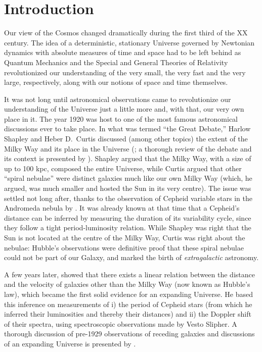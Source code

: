 
\chapter{Introduction}




Our view of the Cosmos changed dramatically during the first third of the XX century. The idea of a deterministic, stationary Universe governed by Newtonian dynamics with absolute measures of time and space had to be left behind as Quantum Mechanics and the Special and General Theories of Relativity revolutionized our understanding of the very small, the very fast and the very large, respectively, along with our notions of space and time themselves.

It was not long until astronomical observations came to revolutionize our understanding of the Universe just a little more and, with that, our very own place in it.
%
The year 1920 was host to one of the most famous astronomical discussions ever to take place. In what was termed ``the Great Debate,'' Harlow Shapley and Heber D.\ Curtis discussed (among other topics) the extent of the Milky Way and its place in the Universe (\citealt{shapley21}; a thorough review of the debate and its context is presented by \citealt{trimble95}). Shapley argued that the Milky Way, with a size of up to 100 kpc, composed the entire Universe, while Curtis argued that other ``spiral nebulae'' were distinct galaxies much like our own Milky Way (which, he argued, was much smaller and hosted the Sun in its very centre). The issue was settled not long after, thanks to the observation of Cepheid variable stars in the Andromeda nebula by \cite{hubble25}. It was already known at that time that a Cepheid's distance can be inferred by measuring the duration of its variability cycle, since they follow a tight period-luminosity relation. While Shapley was right that the Sun is not located at the centre of the Milky Way, Curtis was right about the nebulae: Hubble's observations were definitive proof that these spiral nebulae could not be part of our Galaxy, and marked the birth of \emph{extragalactic} astronomy. 

A few years later, \cite{hubble29} showed that there exists a linear relation between the distance and the velocity of galaxies other than the Milky Way (now known as Hubble's law), which became the first solid evidence for an expanding Universe. He based this inference on measurements of i) the period of Cepheid stars (from which he inferred their luminosities and thereby their distances) and ii) the Doppler shift of their spectra, using spectroscopic observations made by Vesto Slipher. A thorough discussion of pre-1929 observations of receding galaxies and discussions of an expanding Universe is presented by \cite{trimble12,trimble13}.

